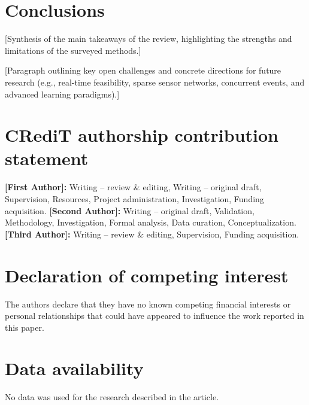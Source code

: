 \documentclass[final,5p,times,twocolumn]{elsarticle}
\begin{document}
\section{Conclusions}\label{sec:conclusions}

[Synthesis of the main takeaways of the review, highlighting the strengths and limitations of the surveyed methods.]

[Paragraph outlining key open challenges and concrete directions for future research (e.g., real-time feasibility, sparse sensor networks, concurrent events, and advanced learning paradigms).]

\section*{CRediT authorship contribution statement}
\textbf{[First Author]:} Writing -- review \& editing, Writing -- original draft, Supervision, Resources, Project administration, Investigation, Funding acquisition.
\textbf{[Second Author]:} Writing -- original draft, Validation, Methodology, Investigation, Formal analysis, Data curation, Conceptualization.
\textbf{[Third Author]:} Writing -- review \& editing, Supervision, Funding acquisition.

\section*{Declaration of competing interest}
The authors declare that they have no known competing financial interests or personal relationships that could have appeared to influence the work reported in this paper.

\section*{Data availability}
No data was used for the research described in the article.


\end{document}
